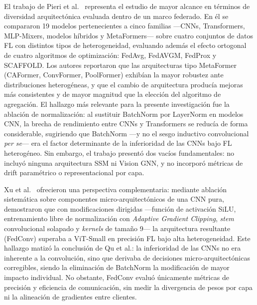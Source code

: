 El trabajo de Pieri et al.\ \cite{pieri2023handlingdataheterogeneityarchitectural} representa el
estudio de mayor alcance en términos de diversidad arquitectónica evaluada dentro de un marco
federado.
En él se compararon 19 modelos pertenecientes a cinco familias ---CNNs, Transformers, MLP-Mixers,
modelos híbridos y MetaFormers--- sobre cuatro conjuntos de datos FL con distintos tipos de
heterogeneidad, evaluando además el efecto ortogonal de cuatro algoritmos de optimización:
FedAvg, FedAVGM, FedProx y SCAFFOLD.
Los autores reportaron que las arquitecturas tipo MetaFormer (CAFormer, ConvFormer, PoolFormer)
exhibían la mayor robustez ante distribuciones heterogéneas, y que el cambio de arquitectura
producía mejoras más consistentes y de mayor magnitud que la elección del algoritmo de agregación.
El hallazgo más relevante para la presente investigación fue la ablación de normalización: al
sustituir BatchNorm por LayerNorm en modelos CNN, la brecha de rendimiento entre CNNs y
Transformers se reducía de forma considerable, sugiriendo que BatchNorm ---y no el sesgo
inductivo convolucional \textit{per se}--- era el factor determinante de la inferioridad de las
CNNs bajo FL heterogéneo.
Sin embargo, el trabajo presentó dos vacíos fundamentales: no incluyó ninguna arquitectura SSM
ni Vision GNN, y no incorporó métricas de drift paramétrico o representacional por capa.

Xu et al.\ \cite{xu2023fedconv} ofrecieron una perspectiva complementaria: mediante ablación
sistemática sobre componentes micro-arquitectónicos de una CNN pura, demostraron que con
modificaciones dirigidas ---función de activación SiLU, entrenamiento libre de normalización con
\textit{Adaptive Gradient Clipping}, \textit{stem} convolucional solapado y \textit{kernels}
de tamaño 9--- la arquitectura resultante (FedConv) superaba a ViT-Small en precisión FL bajo
alta heterogeneidad.
Este hallazgo matizó la conclusión de Qu et al.: la inferioridad de las CNNs no era inherente a
la convolución, sino que derivaba de decisiones micro-arquitectónicas corregibles, siendo la
eliminación de BatchNorm la modificación de mayor impacto individual.
No obstante, FedConv evaluó únicamente métricas de precisión y eficiencia de comunicación, sin
medir la divergencia de pesos por capa ni la alineación de gradientes entre clientes.

